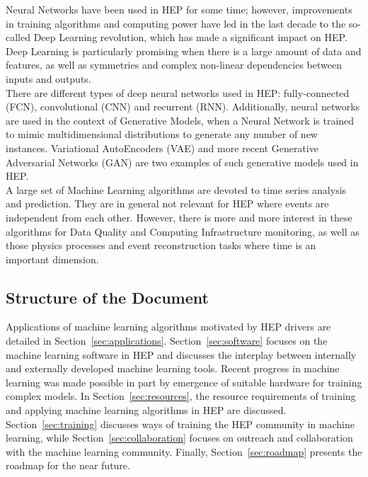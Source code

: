 Neural Networks have been used in HEP for some time; however, improvements in training algorithms and computing power have led in the last decade to the so-called Deep Learning
revolution, which has made a significant impact on HEP. Deep Learning is particularly promising when there is a large amount of data and features, as well as symmetries and complex non-linear dependencies between inputs and outputs.\\

There are different types of deep neural networks used in HEP: fully-connected (FCN), convolutional (CNN) and recurrent (RNN). Additionally, neural networks are used in the context of Generative Models, when a Neural Network is trained to mimic multidimensional distributions to generate any number of new instances. Variational AutoEncoders (VAE) and more recent Generative Adversarial Networks (GAN) are two examples of such generative models used in HEP.\\

A large set of Machine Learning algorithms are devoted to time series analysis and prediction. They are in general not relevant for HEP where events are independent from each other. However, there is more and more interest in these algorithms for Data Quality and Computing Infrastructure monitoring, as well as those physics processes and event reconstruction tasks where time is an important dimension.


\subsection{Structure of the Document}


Applications of machine learning algorithms motivated by HEP drivers are detailed in Section~\ref{sec:applications}. Section~\ref{sec:software} focuses on the machine learning software in HEP and discusses the interplay between internally and externally developed machine learning tools. Recent progress in machine learning was made possible in part by emergence of suitable hardware for training complex models. In Section~\ref{sec:resources}, the resource requirements of training and applying machine learning algorithms in HEP are discussed. Section~\ref{sec:training} discusses ways of training the HEP community in machine learning, while Section~\ref{sec:collaboration} focuses on outreach and collaboration with the machine learning community. Finally, Section~\ref{sec:roadmap} presents the roadmap for the near future.

